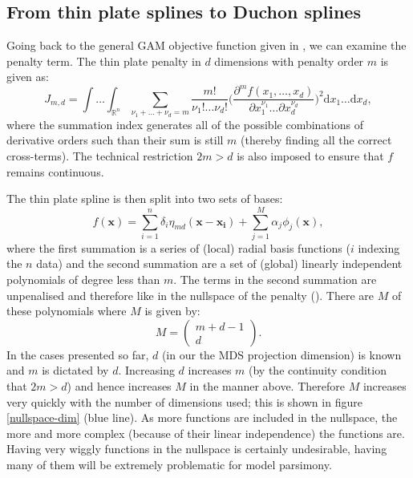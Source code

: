 \subsection{From thin plate splines to Duchon splines}
\label{gds-tprstoduchon}

Going back to the general GAM objective function given in , we can examine the penalty term. The thin plate penalty in $d$ dimensions with penalty order $m$ is given as:
\begin{equation}
J_{m,d} = \int \ldots \int_{\mathbb{R}^n} \sum_{\nu_1 + \dots + \nu_d=m} \frac{m!}{\nu_1! \dots \nu_d!}\Big( \frac{\partial^m f(x_1,\dots,x_d)}{\partial x_1^{\nu_1} \ldots  \partial x_d^{\nu_d}} \Big)^2 \text{d} x_1 \ldots  \text{d} x_d,
\label{tprs-pen}
\end{equation}
where the summation index generates all of the possible combinations of derivative orders such than their sum is still $m$ (thereby finding all the correct cross-terms). The technical restriction $2m>d$ is also imposed to ensure that $f$ remains continuous.

The thin plate spline is then split into two sets of bases:
\begin{equation}
f(\mathbf{x}) = \sum_{i=1}^n \delta_i \eta_{md}(\mathbf{x}-\mathbf{x_i}) + \sum_{j=1}^M \alpha_j \phi_j(\mathbf{x}),
\label{tprs-basis}
\end{equation}
where the first summation is a series of (local) radial basis functions ($i$ indexing the $n$ data) and the second summation are a set of (global) linearly independent polynomials of degree less than $m$. The terms in the second summation are unpenalised and therefore like in the nullspace of the penalty (\cite{wood2003}). There are $M$ of these polynomials where $M$ is given by:
\begin{equation*}
M=\begin{pmatrix} m+d-1 \\ d  \end{pmatrix}.
\end{equation*}
In the cases presented so far, $d$ (in our the MDS projection dimension) is known and $m$ is dictated by $d$. Increasing $d$ increases $m$ (by the continuity condition that $2m>d$) and hence increases $M$ in the manner above. Therefore $M$ increases very quickly with the number of dimensions used; this is shown in figure \ref{nullspace-dim} (blue line). As more functions are included in the nullspace, the more and more complex (because of their linear independence) the functions are. Having very wiggly functions in the nullspace is certainly undesirable, having many of them will be extremely problematic for model parsimony. 

